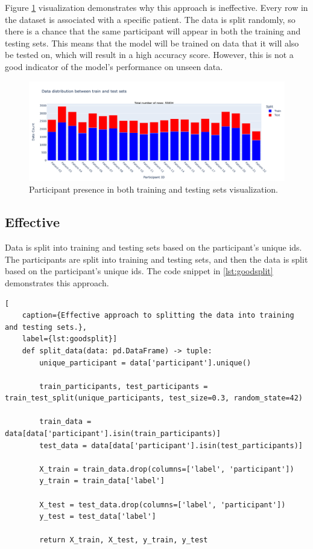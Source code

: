                     Figure \ref{fig:badsplit} visualization demonstrates why this approach is ineffective. Every row in the dataset is associated with a specific patient. The data is split randomly, so there is a chance that the same participant will appear in both the training and testing sets. This means that the model will be trained on data that it will also be tested on, which will result in a high accuracy score. However, this is not a good indicator of the model's performance on unseen data.

                    \begin{figure}[H]
                        \centering
                        \includegraphics[width=1.0\textwidth]{../src/resources/plots/splits/bad.png}
                        \caption{
                            Participant presence in both training and testing sets visualization.
                        }
                        \label{fig:badsplit}
                    \end{figure}
        
                    \newpage

            \subsection{Effective} \label{sec:goodsplit}
            Data is split into training and testing sets based on the participant's unique ids. The participants are split into training and testing sets, and then the data is split based on the participant's unique ids.  The code snippet in \ref{lst:goodsplit} demonstrates this approach.

\begin{lstlisting}[
    caption={Effective approach to splitting the data into training and testing sets.}, 
    label={lst:goodsplit}]
    def split_data(data: pd.DataFrame) -> tuple:    
        unique_participant = data['participant'].unique()

        train_participants, test_participants = train_test_split(unique_participants, test_size=0.3, random_state=42)

        train_data = data[data['participant'].isin(train_participants)]
        test_data = data[data['participant'].isin(test_participants)] 

        X_train = train_data.drop(columns=['label', 'participant'])
        y_train = train_data['label']

        X_test = test_data.drop(columns=['label', 'participant'])
        y_test = test_data['label']
        
        return X_train, X_test, y_train, y_test
\end{lstlisting}

